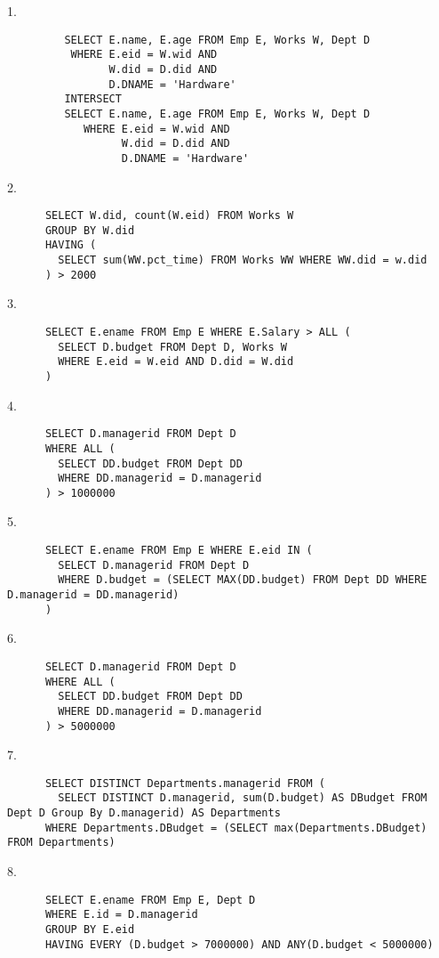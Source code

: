 \begin{problem}{5.4}
  \begin{solution}
    1.
      \begin{lstlisting}
         SELECT E.name, E.age FROM Emp E, Works W, Dept D
          WHERE E.eid = W.wid AND
                W.did = D.did AND
                D.DNAME = 'Hardware'
         INTERSECT
         SELECT E.name, E.age FROM Emp E, Works W, Dept D
            WHERE E.eid = W.wid AND
                  W.did = D.did AND
                  D.DNAME = 'Hardware'
       \end{lstlisting}
    2.
    \begin{lstlisting}
      SELECT W.did, count(W.eid) FROM Works W
      GROUP BY W.did
      HAVING (
        SELECT sum(WW.pct_time) FROM Works WW WHERE WW.did = w.did
      ) > 2000
    \end{lstlisting}
    3.
    \begin{lstlisting}
      SELECT E.ename FROM Emp E WHERE E.Salary > ALL (
        SELECT D.budget FROM Dept D, Works W
        WHERE E.eid = W.eid AND D.did = W.did
      )
    \end{lstlisting}
    4.
    \begin{lstlisting}
      SELECT D.managerid FROM Dept D
      WHERE ALL (
        SELECT DD.budget FROM Dept DD
        WHERE DD.managerid = D.managerid
      ) > 1000000
    \end{lstlisting}
    5.
    \begin{lstlisting}
      SELECT E.ename FROM Emp E WHERE E.eid IN (
        SELECT D.managerid FROM Dept D
        WHERE D.budget = (SELECT MAX(DD.budget) FROM Dept DD WHERE D.managerid = DD.managerid)
      )
    \end{lstlisting}
    6.
    \begin{lstlisting}
      SELECT D.managerid FROM Dept D
      WHERE ALL (
        SELECT DD.budget FROM Dept DD
        WHERE DD.managerid = D.managerid
      ) > 5000000
    \end{lstlisting}
    7.
    \begin{lstlisting}
      SELECT DISTINCT Departments.managerid FROM (
        SELECT DISTINCT D.managerid, sum(D.budget) AS DBudget FROM Dept D Group By D.managerid) AS Departments
      WHERE Departments.DBudget = (SELECT max(Departments.DBudget) FROM Departments)
    \end{lstlisting}
    8.
    \begin{lstlisting}
      SELECT E.ename FROM Emp E, Dept D
      WHERE E.id = D.managerid
      GROUP BY E.eid
      HAVING EVERY (D.budget > 7000000) AND ANY(D.budget < 5000000)
    \end{lstlisting}
  \end{solution}
\end{problem}


